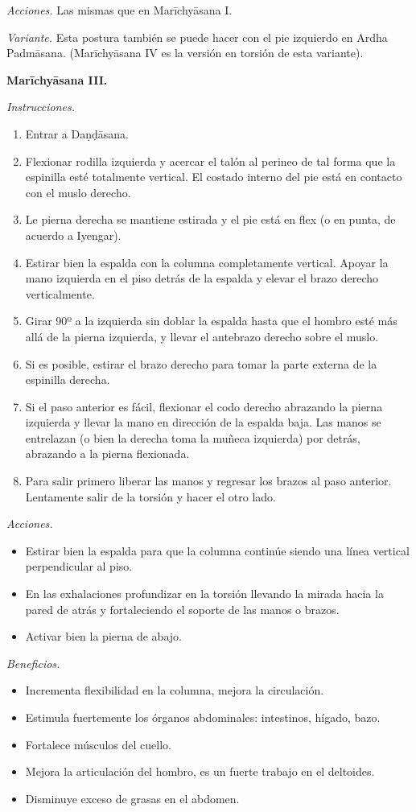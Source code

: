 \emph{Acciones.} Las mismas que en
Marīchyāsana I.

\emph{Variante.} Esta postura también se
puede hacer con el pie izquierdo en Ardha
Padmāsana. (Marīchyāsana IV es la versión en
torsión de esta variante).

\medskip\noindent\textbf{Marīchyāsana III.}

\emph{Instrucciones.}
\begin{enumerate}
\item Entrar a Daṇḍāsana.
\item Flexionar rodilla izquierda y acercar
el talón al perineo de tal forma que la
espinilla esté totalmente vertical. El
costado interno del pie está en contacto con
el muslo derecho.
\item Le pierna derecha se mantiene estirada
y el pie está en flex (o en punta, de acuerdo
a Iyengar).
\item Estirar bien la espalda con la columna
completamente vertical. Apoyar la mano
izquierda en el piso detrás de la espalda y
elevar el brazo derecho verticalmente.
\item Girar 90º a la izquierda sin doblar la
espalda hasta que el hombro esté más allá de
la pierna izquierda, y llevar el antebrazo
derecho sobre el muslo.
\item Si es posible, estirar el brazo derecho
para tomar la parte externa de la espinilla
derecha.
\item Si el paso anterior es fácil, flexionar
el codo derecho abrazando la pierna izquierda
y llevar la mano en dirección de la espalda
baja. Las manos se entrelazan (o bien la
derecha toma la muñeca izquierda) por detrás,
abrazando a la pierna flexionada.
\item Para salir primero liberar las manos y
regresar los brazos al paso anterior.
Lentamente salir de la torsión y hacer el
otro lado.
\end{enumerate}

\emph{Acciones.}
\begin{itemize}
\item Estirar bien la espalda para que la
columna continúe siendo una línea vertical
perpendicular al piso.
\item En las exhalaciones profundizar en la
torsión llevando la mirada hacia la pared de
atrás y fortaleciendo el soporte de las manos
o brazos.
\item Activar bien la pierna de abajo.
\end{itemize}

\emph{Beneficios.}
\begin{itemize}
\item Incrementa flexibilidad en la columna,
mejora la circulación.
\item Estimula fuertemente los órganos
abdominales: intestinos, hígado, bazo.
\item Fortalece músculos del cuello.
\item Mejora la articulación del hombro, es
un fuerte trabajo en el deltoides.
\item Disminuye exceso de grasas en el
abdomen.
\end{itemize}


